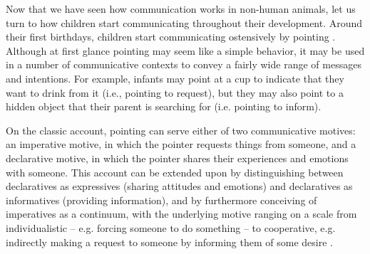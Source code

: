 Now that we have seen how communication works in non-human animals, let us turn to how children start communicating throughout their development.
Around their first birthdays, children start communicating ostensively by pointing \citep{Tomasello08-origins}.
Although at first glance pointing may seem like a simple behavior, it may be used in a number of communicative contexts to convey a fairly wide range of messages and intentions.
For example, infants may point at a cup to indicate that they want to drink from it (i.e., pointing to request), but they may also point to a hidden object that their parent is searching for (i.e. pointing to inform).

On the classic account, pointing can serve either of two communicative motives: an imperative motive, in which the pointer requests things from someone, and a declarative motive, in which the pointer shares their experiences and emotions with someone.
This account can be extended upon by distinguishing between declaratives as expressives (sharing attitudes and emotions) and declaratives as informatives (providing information), and by furthermore conceiving of imperatives as a continuum, with the underlying motive ranging on a scale from individualistic -- e.g. forcing someone to do something -- to cooperative, e.g. indirectly making a request to someone by informing them of some desire \citep{Tomasello08-origins}.

